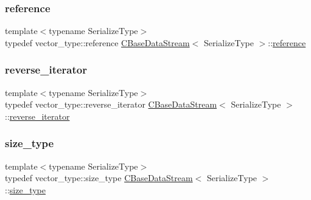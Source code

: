\mbox{\label{class_c_base_data_stream_a74ec577e6f675c786880b39700b8f317}} 
\subsubsection{\texorpdfstring{reference}{reference}}
{\footnotesize\ttfamily template$<$typename Serialize\+Type$>$ \\
typedef vector\+\_\+type\+::reference \mbox{\hyperlink{class_c_base_data_stream}{C\+Base\+Data\+Stream}}$<$ Serialize\+Type $>$\+::\mbox{\hyperlink{class_c_base_data_stream_a74ec577e6f675c786880b39700b8f317}{reference}}}

\mbox{\label{class_c_base_data_stream_aecb04ae414c994e0c43aa0ed423b8824}} 
\subsubsection{\texorpdfstring{reverse\+\_\+iterator}{reverse\_iterator}}
{\footnotesize\ttfamily template$<$typename Serialize\+Type$>$ \\
typedef vector\+\_\+type\+::reverse\+\_\+iterator \mbox{\hyperlink{class_c_base_data_stream}{C\+Base\+Data\+Stream}}$<$ Serialize\+Type $>$\+::\mbox{\hyperlink{class_c_base_data_stream_aecb04ae414c994e0c43aa0ed423b8824}{reverse\+\_\+iterator}}}

\mbox{\label{class_c_base_data_stream_ad042ddea628c43357b9b13be89c71964}} 
\subsubsection{\texorpdfstring{size\+\_\+type}{size\_type}}
{\footnotesize\ttfamily template$<$typename Serialize\+Type$>$ \\
typedef vector\+\_\+type\+::size\+\_\+type \mbox{\hyperlink{class_c_base_data_stream}{C\+Base\+Data\+Stream}}$<$ Serialize\+Type $>$\+::\mbox{\hyperlink{class_c_base_data_stream_ad042ddea628c43357b9b13be89c71964}{size\+\_\+type}}}

